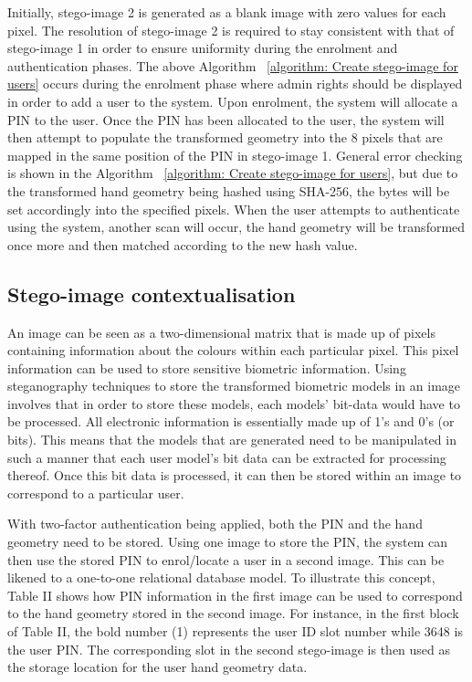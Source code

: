 Initially, stego-image 2 is generated as a blank image with zero values for each pixel. The resolution of stego-image 2 is required to stay consistent with that of stego-image 1 in order to ensure uniformity during the enrolment and authentication phases. The above Algorithm ~\ref{algorithm: Create stego-image for users} occurs during the enrolment phase where admin rights should be displayed in order to add a user to the system. Upon enrolment, the system will allocate a PIN to the user. Once the PIN has been allocated to the user, the system will then attempt to populate the transformed geometry into the 8 pixels that are mapped in the same position of the PIN in stego-image 1. General error checking is shown in the Algorithm ~\ref{algorithm: Create stego-image for users}, but due to the transformed hand geometry being hashed using SHA-256, the bytes will be set accordingly into the specified pixels. When the user attempts to authenticate using the system, another scan will occur, the hand geometry will be transformed once more and then matched according to the new hash value.

\subsection{Stego-image contextualisation}

An image can be seen as a two-dimensional matrix that is made up of pixels containing information about the colours within each particular pixel. This pixel information can be used to store sensitive biometric information. Using steganography techniques to store the transformed biometric models in an image involves that in order to store these models, each models’ bit-data would have to be processed. All electronic information is essentially made up of 1’s and 0’s (or bits). This means that the models that are generated need to be manipulated in such a manner that each user model’s bit data can be extracted for processing thereof. Once this bit data is processed, it can then be stored within an image to correspond to a particular user. 

With two-factor authentication being applied, both the PIN and the hand geometry need to be stored. Using one image to store the PIN, the system can then use the stored PIN to enrol/locate a user in a second image. This can be likened to a one-to-one relational database model. To illustrate this concept, Table II shows how PIN information in the first image can be used to correspond to the hand geometry stored in the second image. For instance, in the first block of Table II, the bold number (1) represents the user ID slot number while 3648 is the user PIN. The corresponding slot in the second stego-image is then used as the storage location for the user hand geometry data.

